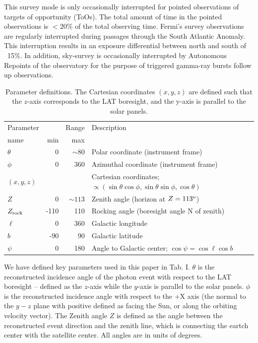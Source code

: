 \documentclass[aps,twocolumn,prd,superscriptaddress,showpacs,nofootinbib,fixfloat]{revtex4}
\newcommand{\degree}{^{\rm o}}
\newcommand{\zrock}{$Z_{\rm rock}$}
\begin{document}
This survey mode is only occasionally interrupted for
pointed observations of targets of opportunity (ToOs). The
total amount of time in the pointed observations is $<$20\%
of the total observing time. Fermi's survey observations are
regularly interrupted during passages through the South
Atlantic Anomaly. This interruption results in an exposure
differential between north and south of ~15\%. In addition,
sky-survey is occasionally interrupted by Autonomous
Repoints of the observatory for the purpose of triggered
gamma-ray bursts follow up observations.



\begin{table}
\begin{center}
  \begin{tabular}{l|rr|l}
    \hline
    Parameter & & Range &  Description\\
    name      & min & max &            \\
    \hline
    $\theta$ &    0 &  $\sim80$ & Polar coordinate (instrument frame) \\
    $\phi$   &    0 &       360 & Azimuthal coordinate (instrument frame) \\
    $(x,y,z)$&      &     & Cartesian coordinates;
    $\propto(\sin\theta\cos\phi, \sin\theta\sin\phi, \cos\theta)$\\
    $Z$      &    0 & $\sim113$ & Zenith angle (horizon at $Z=113\degree$) \\
    \zrock\  & -110 & 110 & Rocking angle (boresight angle N of zenith) \\
    $\ell$   &    0 & 360 & Galactic longitude \\
    $b$      &  -90 &  90 & Galactic latitude \\
    $\psi$   &    0 & 180 & Angle to Galactic center; $\cos\psi=\cos\ell\cos b$ \\
    \hline
  \end{tabular}
  \caption{Parameter definitions. The Cartesian coordinates $(x, y, z)$ are
  defined such that the $z$-axis corresponds to the LAT boresight, and the
  y-axis is parallel to the solar panels.}
  \label{tab:eventRatios}
\end{center}
\end{table}


We have defined key parameters used in this paper in
Tab. I. $\theta$ is the reconstructed
incidence angle of the photon event with respect to the LAT
boresight -- defined as the $z$-axis while the $y$-axis is
parallel to the solar panels. $\phi$ is the reconstructed
incidence angle with respect to the +X axis (the normal to
the $y-z$ plane with positive defined as facing the Sun, or
along the orbiting velocity vector). The Zenith angle $Z$ is
defined as the angle between the reconstructed event
direction and the zenith line, which is connecting the
eartch center with the satellite center. All angles are in
units of degrees.
\end{document}
